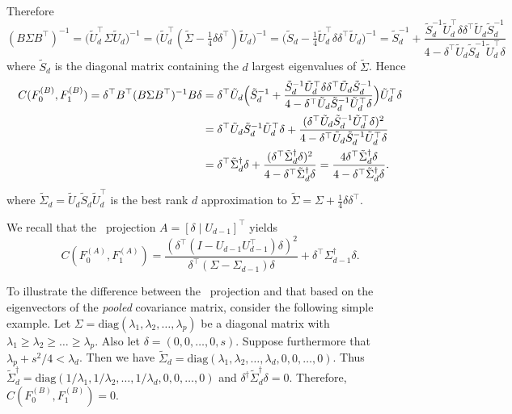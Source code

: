 \documentclass[10pt]{article}
\begin{document}
Therefore
$$ (B \Sigma B^{\top})^{-1} = \bigl(\tilde{U}_{d}^{\top} \Sigma \tilde{U}_d \bigr)^{-1} = \bigl( \tilde{U}_d^{\top} (\tilde{\Sigma} - \tfrac{1}{4} \delta \delta^{\top}) \tilde{U}_d\bigr)^{-1} = \bigl(\tilde{S}_d - \tfrac{1}{4} \tilde{U}_d^{\top} \delta \delta^{\top} \tilde{U}_d \bigr)^{-1} = \tilde{S}_d^{-1} + \frac{\tilde{S}_d^{-1} \tilde{U}_d^{\top} \delta \delta^{\top} \tilde{U}_d \tilde{S}_d^{-1}}{4 - \delta^{\top} \tilde{U}_d \tilde{S}_d^{-1} \tilde{U}_d^{\top} \delta} $$
where $\tilde{S}_d$ is the diagonal matrix containing the $d$ largest eigenvalues of $\tilde{\Sigma}$. Hence
\begin{equation}
\begin{split}
C(F_0^{(B)}, F_1^{(B)}) = \delta^{\top} B^{\top} (B \Sigma B^{\top})^{-1} B \delta & = \delta^{\top} \tilde{U}_d \Bigl(\tilde{S}_d^{-1} + \frac{\tilde{S}_d^{-1} \tilde{U}_d^{\top} \delta \delta^{\top} \tilde{U}_d \tilde{S}_d^{-1}}{4 - \delta^{\top} \tilde{U}_d \tilde{S}_d^{-1} \tilde{U}_d^{\top} \delta} \Bigr) \tilde{U}_d^{\top} \delta \\ &= \delta^{\top} \tilde{U}_d \tilde{S}_d^{-1} \tilde{U}_d^{\top} \delta + \frac{(\delta^{\top} \tilde{U}_d \tilde{S}_d^{-1} \tilde{U}_d^{\top} \delta)^{2}}{4 - \delta^{\top} \tilde{U}_d \tilde{S}_d^{-1} \tilde{U}_d^{\top} \delta} \\
&= \delta^{\top} \tilde{\Sigma}_d^{\dagger} \delta + \frac{(\delta^{\top} \tilde{\Sigma}_d^{\dagger} \delta)^2}{4 - \delta^{\top} \tilde{\Sigma}_d^{\dagger} \delta} = \frac{4 \delta^{\top} \tilde{\Sigma}_d^{\dagger} \delta}{4 - \delta^{\top} \tilde{\Sigma}_d^{\dagger} \delta}.
\end{split}
\end{equation}
where $\tilde{\Sigma}_d = \tilde{U}_d \tilde{S}_d \tilde{U}_d^{\top}$ is the best rank $d$ approximation to $\tilde{\Sigma} = \Sigma + \tfrac{1}{4} \delta \delta^{\top}$.

We recall that the \Lol~projection $A = [\delta \mid U_{d-1}]^{\top}$ yields
$$ C(F_0^{(A)}, F_1^{(A)}) = \frac{(\delta^{\top} (I - U_{d-1} U_{d-1}^{\top}) \delta)^{2}}{\delta^{\top} (\Sigma - \Sigma_{d-1}) \delta} + \delta^{\top} \Sigma_{d-1}^{\dagger} \delta. $$

To illustrate the difference between the \Lol~projection and that based on the eigenvectors of the {\em pooled} covariance matrix, consider the following simple example. Let $\Sigma = \mathrm{diag}(\lambda_1, \lambda_2, \dots, \lambda_p)$ be a diagonal matrix with $\lambda_1 \geq \lambda_2 \geq \dots \geq \lambda_p$. Also let $\delta = (0,0,\dots,0,s)$. Suppose furthermore that $\lambda_p + s^{2}/4 < \lambda_d$. Then we have $\tilde{\Sigma}_d = \mathrm{diag}(\lambda_1, \lambda_2, \dots, \lambda_d, 0, 0, \dots, 0)$. Thus $\tilde{\Sigma}_d^{\dagger} = \mathrm{diag}(1/\lambda_1, 1/\lambda_2, \dots, 1/\lambda_d, 0,0, \dots, 0)$ and $\delta^{\dagger} \tilde{\Sigma}_d^{\dagger} \delta = 0$. Therefore, $C(F_0^{(B)}, F_1^{(B)}) = 0$.
\end{document}

